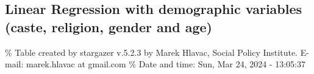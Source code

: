 \documentclass[
]{article}
\begin{document}
\begin{landscape}

\hypertarget{linear-regression-with-demographic-variables-caste-religion-gender-and-age}{%
\subsection{Linear Regression with demographic variables (caste,
religion, gender and
age)}\label{linear-regression-with-demographic-variables-caste-religion-gender-and-age}}

\begingroup\small\setlength{\tabcolsep}{1pt}\renewcommand{\arraystretch}{0.7}

\% Table created by stargazer v.5.2.3 by Marek Hlavac, Social Policy
Institute. E-mail: marek.hlavac at gmail.com \% Date and time: Sun, Mar
24, 2024 - 13:05:37


\end{landscape}
\end{document}
